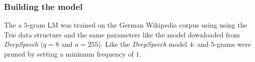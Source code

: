 \subsubsection{Building the model}

The a $5$-gram \ac{LM} was trained on the German Wikipedia corpus using  using the Trie data structure and the same parameters like the model downloaded from \textit{DeepSpeech} ($q=8$ and $a=255$). Like the \textit{DeepSpeech} model $4$- and $5$-grams were pruned by setting a minimum frequency of $1$.




